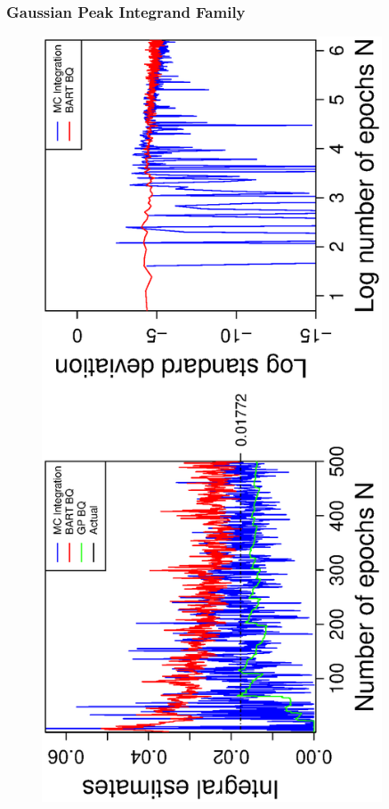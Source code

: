 \subsubsection*{Gaussian Peak Integrand Family}
\vspace{-1.5cm}
\begin{figure}[H]
  \centering
  \hspace{-1.6cm}
  \begin{minipage}[b]{0.4\textwidth}
    \includegraphics[width = 0.9\textwidth, angle = -90]{report/Figures/4/convergenceMean41Dimensions.eps}

\end{minipage}
\end{figure}
